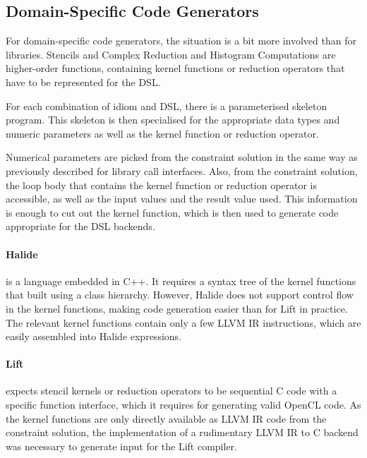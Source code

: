 \subsection{Domain-Specific Code Generators}

    For domain-specific code generators, the situation is a bit more involved
    than for libraries.
    Stencils and Complex Reduction and Histogram Computations are higher-order
    functions, containing kernel functions or reduction operators that have to
    be represented for the DSL.

    For each combination of idiom and DSL, there is a parameterised
    skeleton program.
    This skeleton is then specialised for the appropriate data types and numeric
    parameters as well as the kernel function or reduction operator.

    Numerical parameters are picked from the constraint solution in the same way
    as previously described for library call interfaces.
    Also, from the constraint solution, the loop body that contains the kernel
    function or reduction operator is accessible, as well as the input values
    and the result value used.
    This information is enough to cut out the kernel function, which is then
    used to generate code appropriate for the DSL backends.

    \paragraph*{Halide}
    is a language embedded in C++.
    It requires a syntax tree of the kernel functions that built using a class
    hierarchy.
    However, Halide does not support control flow in the kernel functions,
    making code generation easier than for Lift in practice.
    The relevant kernel functions contain only a few LLVM IR instructions, which
    are easily assembled into Halide expressions.

    \paragraph*{Lift}
    expects stencil kernels or reduction operators to be sequential C code with
    a specific function interface, which it requires for generating valid
    OpenCL code.
    As the kernel functions are only directly available as LLVM IR code from the
    constraint solution, the implementation of a rudimentary LLVM IR to C
    backend was necessary to generate input for the Lift compiler.

